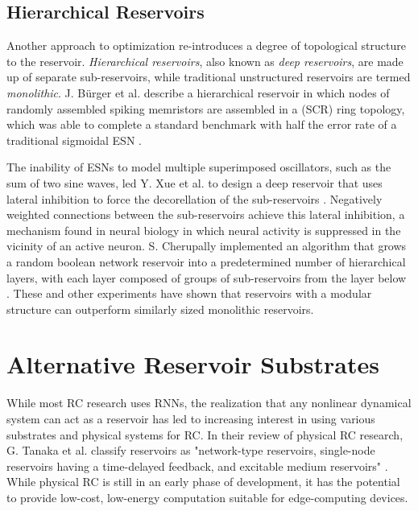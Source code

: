 \documentclass{article}
\begin{document}
      \subsection{Hierarchical Reservoirs}
      Another approach to optimization re-introduces a degree of topological 
      structure to the reservoir.  \textit{Hierarchical reservoirs}, also known 
      as \textit{deep reservoirs}, are made up of separate sub-reservoirs, 
      while traditional unstructured reservoirs are termed \textit{monolithic}.  
      J.  B\"{u}rger et al.  describe a hierarchical reservoir in which nodes 
      of randomly assembled spiking memristors are assembled in a (SCR) ring 
      topology, which was able to complete a standard benchmark with half the 
      error rate of a traditional sigmoidal ESN  \cite{burger2015hierarchical}.  
      \par The inability of ESNs to model multiple superimposed oscillators, 
      such as the sum of two sine waves, led Y. Xue et al. to design a  deep 
      reservoir that uses lateral inhibition to force the decorellation of the 
      sub-reservoirs \cite{xue2007decoupled}.  Negatively weighted connections 
      between the sub-reservoirs achieve this lateral inhibition, a mechanism 
      found in neural biology in which neural activity is suppressed in the 
      vicinity of an active neuron. S.  Cherupally implemented an algorithm 
      that grows a random boolean network reservoir into a predetermined number 
      of hierarchical layers, with each layer composed of groups of 
      sub-reservoirs from the layer below  \cite{cherupally2017hierarchical}.  
      These and other experiments have shown that reservoirs with a modular 
      structure can outperform similarly sized monolithic reservoirs. 

      
     \section{Alternative Reservoir Substrates}\label{alternative}
     While most RC research uses RNNs, the realization that any nonlinear 
     dynamical system can act as a reservoir has led to increasing interest in 
     using various substrates and physical systems for RC. In their review of 
     physical RC research, G.  Tanaka et al. classify reservoirs as 
     "network-type reservoirs, single-node reservoirs having a time-delayed 
     feedback, and excitable medium reservoirs" \cite{tanaka2018recent}. While 
     physical RC is still in an early phase of development, it has the 
     potential to provide low-cost, low-energy computation suitable for 
     edge-computing devices.
\end{document}
